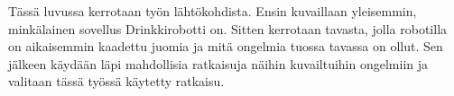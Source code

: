 Tässä luvussa kerrotaan työn lähtökohdista. Ensin kuvaillaan yleisemmin, minkälainen sovellus Drinkkirobotti on. Sitten kerrotaan tavasta, jolla robotilla on aikaisemmin kaadettu juomia ja mitä ongelmia tuossa tavassa on ollut. Sen jälkeen käydään läpi mahdollisia ratkaisuja näihin kuvailtuihin ongelmiin ja valitaan tässä työssä käytetty ratkaisu.
